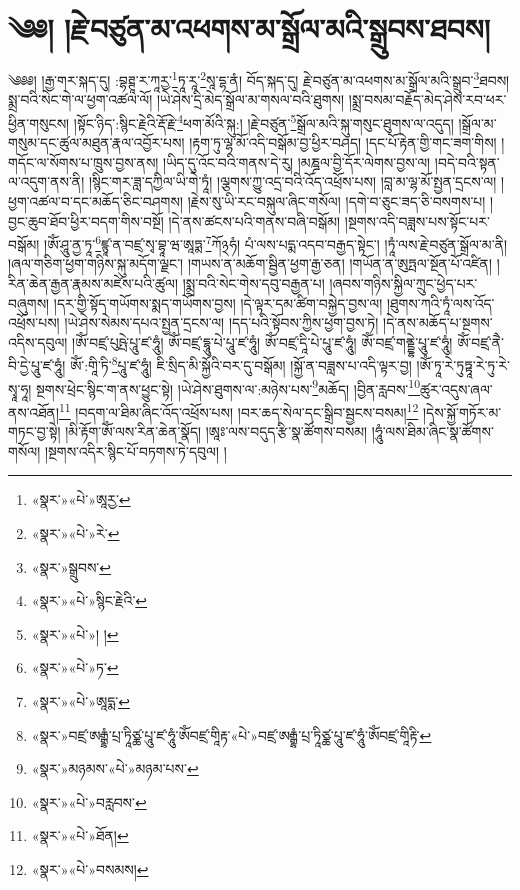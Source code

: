 \chapter{༄༅། །རྗེ་བཙུན་མ་འཕགས་མ་སྒྲོལ་མའི་སྒྲུབས་ཐབས།}༄༅༅། །རྒྱ་གར་སྐད་དུ། :བྷཊྚཱ་ར་ཀཱརྱ་\footnote{«སྣར་»«པེ་»ཨཱརྱ་}ཏཱ་རཱ་\footnote{«སྣར་»«པེ་»རེ་}སཱ་དྷ་ནཾ། བོད་སྐད་དུ། རྗེ་བཙུན་མ་འཕགས་མ་སྒྲོལ་མའི་སྒྲུབ་\footnote{«སྣར་»སྒྲུབས་}ཐབས། སྨྲ་བའི་སེང་གེ་ལ་ཕྱག་འཚལ་ལོ། །ཡེ་ཤེས་དྲི་མེད་སྒྲོལ་མ་གསལ་བའི་ཐུགས། །སྨྲ་བསམ་བརྗོད་མེད་ཤེས་རབ་ཕར་ཕྱིན་གསུངས། །སྟོང་ཉིད་:སྙིང་རྗེའི་རྡོ་རྗེ་\footnote{«སྣར་»«པེ་»སྙིང་རྗེའི་}ཕག་མོའི་སྐུ:། །རྗེ་བཙུན་\footnote{«སྣར་»«པེ་»། །}སྒྲོལ་མའི་སྐུ་གསུང་ཐུགས་ལ་འདུད། །སྒྲོལ་མ་གསུམ་དང་ཚུལ་མཐུན་རྣལ་འབྱོར་པས། །རྟག་ཏུ་ལྷ་མོ་འདི་བསྒོམ་བྱ་ཕྱིར་བཤད། །དང་པོ་རྟེན་གྱི་གང་ཟག་གིས། །གདོང་ལ་སོགས་པ་ཁྲུས་བྱས་ནས། །ཡིད་དུ་འོང་བའི་གནས་དེ་རུ། །མཎྜལ་བྱི་དོར་ལེགས་བྱས་ལ། །བདེ་བའི་སྟན་ལ་འདུག་ནས་ནི། །སྙིང་གར་ཟླ་དཀྱིལ་ཡི་གེ་ཏཱཾ། །ལྕགས་ཀྱུ་འདྲ་བའི་འོད་འཕྲོས་པས། །བླ་མ་ལྷ་མོ་སྤྱན་དྲངས་ལ། །ཕྱག་འཚལ་བ་དང་མཆོད་ཅིང་བཤགས། །རྗེས་སུ་ཡི་རང་བསྐུལ་ཞིང་གསོལ། །དགེ་བ་ཅུང་ཟད་ཅི་བསགས་པ། །བྱང་ཆུབ་ཐོབ་ཕྱིར་བདག་གིས་བསྔོ། །དེ་ནས་ཚངས་པའི་གནས་བཞི་བསྒོམ། །སྔགས་འདི་བཟླས་པས་སྟོང་པར་བསྒོམ། །ཨོཾ་ཤཱུ་ནྱ་ཏཱ་\footnote{«སྣར་»«པེ་»ཏ་}ཛྙཱ་ན་བཛྲ་སྭ་བྷཱ་ཝ་ཨཱཏྨ་\footnote{«སྣར་»«པེ་»ཨཱདྨ་}ཀོ྅ཧཾ། པཾ་ལས་པདྨ་འདབ་བརྒྱད་སྟེང་། །ཏཱཾ་ལས་རྗེ་བཙུན་སྒྲོལ་མ་ནི། །ཞལ་གཅིག་ཕྱག་གཉིས་སྐུ་མདོག་ལྗང་། །གཡས་ན་མཆོག་སྦྱིན་ཕྱག་རྒྱ་ཅན། །གཡོན་ན་ཨུཏྤལ་སྔོན་པོ་འཛིན། །རིན་ཆེན་རྒྱན་རྣམས་མཛེས་པའི་ཚུལ། །སྨྲ་བའི་སེང་གེས་དབུ་བརྒྱན་པ། །ཞབས་གཉིས་སྐྱིལ་ཀྲུང་ཕྱེད་པར་བཞུགས། །དར་གྱི་སྟོད་གཡོགས་སྨད་གཡོགས་བྱས། །དེ་ལྟར་དམ་ཚིག་བསྐྱེད་བྱས་ལ། །ཐུགས་ཀའི་ཏཱཾ་ལས་འོད་འཕྲོས་པས། །ཡེ་ཤེས་སེམས་དཔའ་སྤྱན་དྲངས་ལ། །དད་པའི་སྟོབས་ཀྱིས་ཕྱག་བྱས་ཏེ། །དེ་ནས་མཆོད་པ་སྔགས་འདིས་དབུལ། །ཨོཾ་བཛྲ་པུཥྤེ་པཱུ་ཛ་ཧཱུཾ། ཨོཾ་བཛྲ་དྷཱུ་པེ་པཱུ་ཛ་ཧཱུཾ། ཨོཾ་བཛྲ་དཱི་པེ་པཱུ་ཛ་ཧཱུཾ། ཨོཾ་བཛྲ་གནྡྷེ་པཱུ་ཛ་ཧཱུཾ། ཨོཾ་བཛྲ་ནཻ་བི་དྱེ་པཱུ་ཛ་ཧཱུཾ། ཨོཾ་:གཱི་ཏི་\footnote{«སྣར་»བཛྲ་ཨརྒྷཾ་པྲ་ཏཱིཙྪ་པཱུ་ཛ་ཧཱུཾ་ཨོཾབཛྲ་གཱིརྟ་«པེ་»བཛྲ་ཨརྒྷཾ་པྲ་ཏཱིཙྪ་པཱུ་ཛ་ཧཱུཾ་ཨོཾབཛྲ་གཱིརྟི་}པཱུ་ཛ་ཧཱུཾ། ཇི་སྲིད་མི་སྐྱོའི་བར་དུ་བསྒོམ། །སྐྱོ་ན་བཟླས་པ་འདི་ལྟར་བྱ། །ཨོཾ་ཏཱ་རེ་ཏུཏྟཱ་རེ་ཏུ་རེ་སྭཱ་ཧཱ། སྔགས་ཕྲེང་སྙིང་ག་ནས་ཕྱུང་སྟེ། །ཡེ་ཤེས་ཐུགས་ལ་:མཉེས་པས་\footnote{«སྣར་»མཉམས་«པེ་»མཉམ་པས་}མཆོད། །བྱིན་རླབས་\footnote{«སྣར་»«པེ་»བརླབས་}ཚུར་འདུས་ཞལ་ནས་འཐོན།\footnote{«སྣར་»«པེ་»ཐོན།} །བདག་ལ་ཐིམ་ཞིང་འོད་འཕྲོས་པས། །བར་ཆད་སེལ་དང་སྒྲིབ་སྦྱངས་བསམ།\footnote{«སྣར་»«པེ་»བསམས།} །དེས་སྐྱོ་གཏོར་མ་གཏང་བྱ་སྟེ། །མི་རྟོག་ཨོཾ་ལས་རིན་ཆེན་སྣོད། །ཨཱཿ་ལས་བདུད་རྩི་སྣ་ཚོགས་བསམ། །ཧཱུཾ་ལས་ཐིམ་ཞིང་སྣ་ཚོགས་གསོལ། །སྔགས་འདིར་སྙིང་པོ་བཏགས་ཏེ་དབུལ། །

